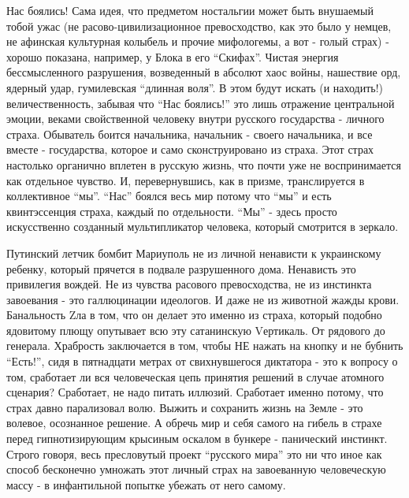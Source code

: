 Нас боялись! Сама идея, что предметом ностальгии может быть внушаемый тобой
ужас (не расово-цивилизационное превосходство, как это было у немцев, не
афинская культурная колыбель и прочие мифологемы, а вот - голый страх) - хорошо
показана, например, у Блока в его \enquote{Скифах}. Чистая энергия бессмысленного
разрушения, возведенный в абсолют хаос войны, нашествие орд, ядерный удар,
гумилевская \enquote{длинная воля}. В этом будут искать (и находить!) величественность,
забывая что \enquote{Нас боялись!} это лишь отражение центральной эмоции, веками
свойственной человеку внутри русского государства - личного страха. Обыватель
боится начальника, начальник - своего начальника, и все вместе - государства,
которое и само сконструировано из страха. Этот страх настолько органично
вплетен в русскую жизнь, что почти уже не воспринимается как отдельное чувство.
И, перевернувшись, как в призме, транслируется в коллективное \enquote{мы}. \enquote{Нас}
боялся весь мир потому что \enquote{мы} и есть квинтэссенция страха, каждый по
отдельности. \enquote{Мы} - здесь просто искусственно созданный мультипликатор
человека, который смотрится в зеркало.

Путинский летчик бомбит Мариуполь не из личной ненависти к украинскому ребенку,
который прячется в подвале разрушенного дома. Ненависть это привилегия вождей.
Не из чувства расового превосходства, не из инстинкта завоевания - это
галлюцинации идеологов. И даже не из животной жажды крови. Банальность Zла в
том, что он делает это именно из страха, который подобно ядовитому плющу
опутывает всю эту сатанинскую Vертикаль. От рядового до генерала. Храбрость
заключается в том, чтобы НЕ нажать на кнопку и не бубнить \enquote{Есть!}, сидя в
пятнадцати метрах от свихнувшегося диктатора - это к вопросу о том, сработает
ли вся человеческая цепь принятия решений в случае атомного сценария?
Сработает, не надо питать иллюзий. Сработает именно потому, что страх давно
парализовал волю. Выжить и сохранить жизнь на Земле - это волевое, осознанное
решение. А обречь мир и себя самого на гибель в страхе перед гипнотизирующим
крысиным оскалом в бункере - панический инстинкт. Строго говоря, весь
пресловутый проект \enquote{русского мира} это ни что иное как способ  бесконечно
умножать этот личный страх на завоеванную человеческую массу - в инфантильной
попытке убежать от него самому.

